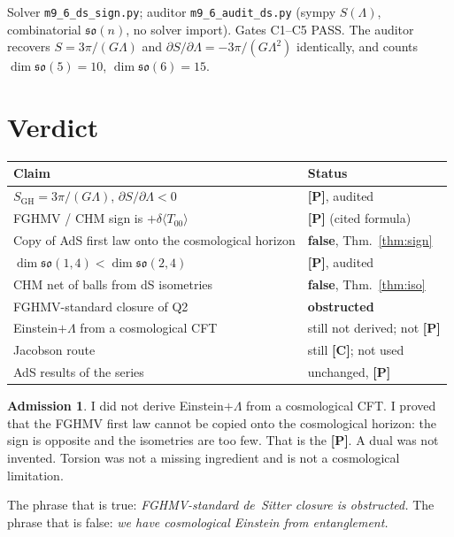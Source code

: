 \documentclass[11pt]{article}
\theoremstyle{definition}
\newtheorem*{admission}{Admission}
\newcommand{\pP}{\textbf{[P]}}
\newcommand{\pC}{\textbf{[C]}}
\begin{document}
Solver \texttt{m9\_6\_ds\_sign.py}; auditor
\texttt{m9\_6\_audit\_ds.py} (sympy $S(\Lambda)$, combinatorial
$\mathfrak{so}(n)$, no solver import). Gates C1--C5 PASS. The
auditor recovers $S=3\pi/(G\Lambda)$ and
$\partial S/\partial\Lambda=-3\pi/(G\Lambda^2)$ identically, and
counts $\dim\mathfrak{so}(5)=10$, $\dim\mathfrak{so}(6)=15$.

\section{Verdict}

\begin{center}
\begin{tabular}{@{}p{}p{}@{}}
\toprule
Claim & Status \\
\midrule
$S_{\mathrm{GH}}=3\pi/(G\Lambda)$, $\partial S/\partial\Lambda<0$
  & \pP{}, audited \\
FGHMV / CHM sign is $+\delta\langle T_{00}\rangle$
  & \pP{} (cited formula) \\
Copy of AdS first law onto the cosmological horizon
  & \textbf{false}, Thm.~\ref{thm:sign} \\
$\dim\mathfrak{so}(1,4)<\dim\mathfrak{so}(2,4)$
  & \pP{}, audited \\
CHM net of balls from dS isometries
  & \textbf{false}, Thm.~\ref{thm:iso} \\
FGHMV-standard closure of Q2
  & \textbf{obstructed} \\
Einstein$+\Lambda$ from a cosmological CFT
  & still not derived; not \pP{} \\
Jacobson route
  & still \pC{}; not used \\
AdS results of the series
  & unchanged, \pP{} \\
\bottomrule
\end{tabular}
\end{center}

\begin{admission}
I did not derive Einstein$+\Lambda$ from a cosmological CFT. I
proved that the FGHMV first law cannot be copied onto the
cosmological horizon: the sign is opposite and the isometries are
too few. That is the \pP{}. A dual was not invented. Torsion was
not a missing ingredient and is not a cosmological limitation.
\end{admission}

The phrase that is true: \emph{FGHMV-standard de~Sitter closure is
obstructed.}
The phrase that is false: \emph{we have cosmological Einstein from
entanglement.}
\end{document}
